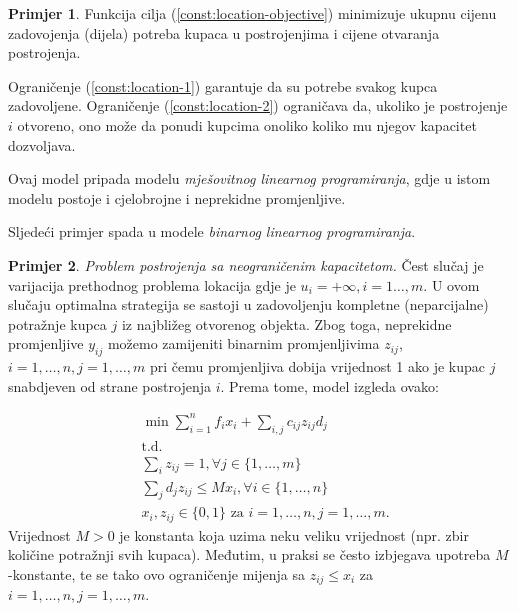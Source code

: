 \documentclass[b5paper, utf8, 11pt, colorlinks]{book}
\theoremstyle{definition}
\newtheorem{primjer}{Primjer}[chapter]
\begin{document}
\begin{primjer}
	Funkcija cilja (\ref{const:location-objective}) minimizuje ukupnu cijenu zadovojenja  (dijela) potreba kupaca u postrojenjima i cijene otvaranja postrojenja. 
	
	Ograničenje (\ref{const:location-1}) garantuje da su potrebe svakog kupca zadovoljene.  
	Ograničenje (\ref{const:location-2}) ograničava da, ukoliko je postrojenje $i$ otvoreno, ono može da ponudi kupcima onoliko koliko mu njegov kapacitet dozvoljava.  
	
	
	Ovaj model pripada modelu \emph{mješovitnog linearnog programiranja}, gdje u istom modelu postoje i cjelobrojne i neprekidne promjenljive.
\end{primjer}

Sljedeći primjer spada u modele \emph{binarnog linearnog programiranja}. 

\begin{primjer}
	
	\emph{Problem postrojenja sa neograničenim kapacitetom.}
	Čest slučaj je varijacija prethodnog problema lokacija gdje je $ u_{i} = + \infty,i=1\ldots,m$. U ovom slučaju optimalna strategija se sastoji u zadovoljenju kompletne (neparcijalne) potražnje kupca $j$ iz najbližeg otvorenog objekta. Zbog toga, neprekidne promjenljive  $y_{ij}$ možemo zamijeniti binarnim promjenljivima $z_{ij}$, $i=1,\ldots,n, j=1,\ldots,m$ pri čemu promjenljiva dobija vrijednost 1 ako je kupac $j$ snabdjeven od strane postrojenja $i$. Prema tome, model izgleda ovako:
	
	\begin{align*}
		&\min \sum_{i=1}^n f_i x_i  + \sum_{i,j} c_{ij} z_{ij} d_j \\
		& \mbox{t.d.} \nonumber \\
		& \sum_{i} z_{ij} = 1, \forall j\in\{1,\ldots,m\} \\
		& \sum_{j} d_j z_{ij} \leq M x_i, \forall i \in \{1,\ldots,n\} \\
		& x_i, z_{ij} \in \{0,1\} \mbox{ za } i = 1, \ldots, n, j = 1,  \ldots, m.
	\end{align*}
	Vrijednost $M>0$ je konstanta koja uzima neku veliku vrijednost (npr. zbir količine potražnji svih kupaca). Međutim, u praksi se često  izbjegava upotreba $M$-konstante, te se tako 
	ovo ograničenje mijenja sa $ z_{ij} \leq x_i$ 
	za $ i = 1, \ldots, n, j = 1,  \ldots, m$. %
\end{primjer}
\end{document}
